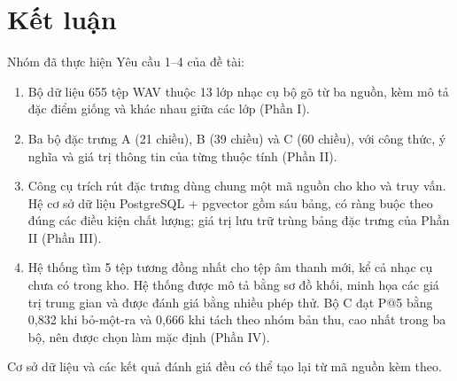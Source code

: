 \documentclass[11pt,a4paper]{article}
\begin{document}
\section*{Kết luận}
Nhóm đã thực hiện Yêu cầu 1--4 của đề tài:
\begin{enumerate}
\item Bộ dữ liệu 655 tệp WAV thuộc 13 lớp nhạc cụ bộ gõ từ ba nguồn, kèm mô tả đặc điểm giống và khác nhau giữa các lớp (Phần I).
\item Ba bộ đặc trưng A (21 chiều), B (39 chiều) và C (60 chiều), với công thức, ý nghĩa và giá trị thông tin của từng thuộc tính (Phần II).
\item Công cụ trích rút đặc trưng dùng chung một mã nguồn cho kho và truy vấn. Hệ cơ sở dữ liệu PostgreSQL + pgvector gồm sáu bảng, có ràng buộc theo đúng các điều kiện chất lượng; giá trị lưu trữ trùng bảng đặc trưng của Phần II (Phần III).
\item Hệ thống tìm 5 tệp tương đồng nhất cho tệp âm thanh mới, kể cả nhạc cụ chưa có trong kho. Hệ thống được mô tả bằng sơ đồ khối, minh họa các giá trị trung gian và được đánh giá bằng nhiều phép thử. Bộ C đạt P@5 bằng 0,832 khi bỏ-một-ra và 0,666 khi tách theo nhóm bản thu, cao nhất trong ba bộ, nên được chọn làm mặc định (Phần IV).
\end{enumerate}
Cơ sở dữ liệu và các kết quả đánh giá đều có thể tạo lại từ mã nguồn kèm theo.
\clearpage
\end{document}
